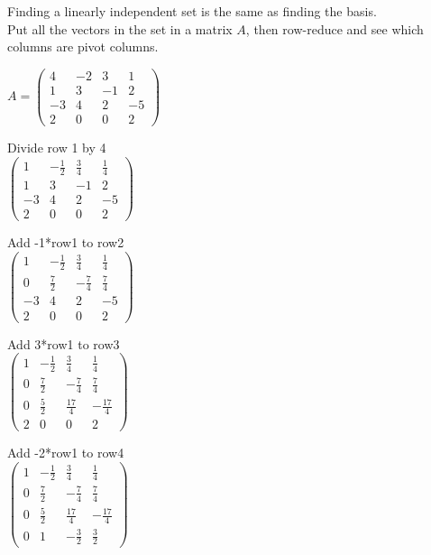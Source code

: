 \documentclass{article}
\begin{document}
Finding a linearly independent set is the same as finding the basis.\\
Put all the vectors in the set in a matrix $A$, then row-reduce and see which columns are pivot columns.

$A =
\left (
    \begin{matrix}
        4 & -2 & 3 & 1\\
        1 & 3 & -1 & 2\\
        -3 & 4 & 2 & -5\\
        2 & 0 & 0 & 2
    \end{matrix}
\right )
$

Divide row 1 by 4\\
$
\left (
    \begin{matrix}
        1 & -\frac{1}{2} & \frac{3}{4} & \frac{1}{4}\\
        1 & 3 & -1 & 2\\
        -3 & 4 & 2 & -5\\
        2 & 0 & 0 & 2
    \end{matrix}
\right )
$

Add -1*row1 to row2\\
$
\left (
    \begin{matrix}
        1 & -\frac{1}{2} & \frac{3}{4} & \frac{1}{4}\\
        0 & \frac{7}{2} & -\frac{7}{4} & \frac{7}{4}\\
        -3 & 4 & 2 & -5\\
        2 & 0 & 0 & 2
    \end{matrix}
\right )
$

Add 3*row1 to row3\\
$
\left (
    \begin{matrix}
        1 & -\frac{1}{2} & \frac{3}{4} & \frac{1}{4}\\
        0 & \frac{7}{2} & -\frac{7}{4} & \frac{7}{4}\\
        0 & \frac{5}{2} & \frac{17}{4} & -\frac{17}{4}\\
        2 & 0 & 0 & 2
    \end{matrix}
\right )
$

Add -2*row1 to row4\\
$
\left (
    \begin{matrix}
        1 & -\frac{1}{2} & \frac{3}{4} & \frac{1}{4}\\
        0 & \frac{7}{2} & -\frac{7}{4} & \frac{7}{4}\\
        0 & \frac{5}{2} & \frac{17}{4} & -\frac{17}{4}\\
        0 & 1 & -\frac{3}{2} & \frac{3}{2}
    \end{matrix}
\right )
$
\end{document}
